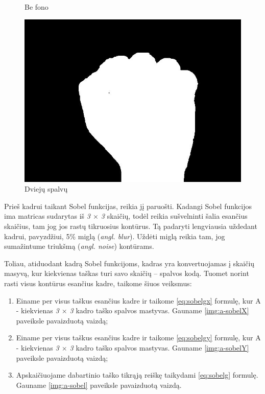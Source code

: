\documentclass{VUMIFInfKursinis}
\begin{document}
\begin{figure}[H]
\begin{minipage}{.3\textwidth}
		\caption{Be fono}
		\label{img:a-black-sign}
	\end{minipage}\hspace{\fill}%
	\begin{minipage}{.3\textwidth}
		\centering
		\includegraphics[width=.8\linewidth]{img/A-white}
		\caption{Dviejų spalvų}
		\label{img:a-white-sign}
	\end{minipage}
\end{figure}

Prieš kadrui taikant Sobel funkcijas, reikia jį paruošti. Kadangi Sobel funkcijos ima matricas sudarytas iš \textit{3 $\times$ 3} skaičių, todėl reikia sušvelninti šalia esančius skaičius, tam jog jos rastų tikruosius kontūrus. Tą padaryti lengviausia uždedant kadrui, pavyzdžiui, 5\% miglą (\textit{angl. blur}). Uždėti miglą reikia tam, jog sumažintume triukšmą (\textit{angl. noise}) kontūrams. 

Toliau, atiduodant kadrą Sobel funkcijoms, kadras yra konvertuojamas į skaičių masyvą, kur kiekvienas taškas turi savo skaičių – spalvos kodą. Tuomet norint rasti visus kontūrus esančius kadre, taikome šiuos veiksmus:

\begin{enumerate}
	\item Einame per visus taškus esančius kadre ir taikome \ref{eq:sobelgx} formulę, kur A - kiekvienas \textit{3 $\times$ 3} kadro taško spalvos mastyvas. Gauname \ref{img:a-sobelX} paveiksle pavaizduotą vaizdą;
	\item Einame per visus taškus esančius kadre ir taikome \ref{eq:sobelgy} formulę, kur A - kiekvienas \textit{3 $\times$ 3} kadro taško spalvos mastyvas. Gauname \ref{img:a-sobelY} paveiksle pavaizduotą vaizdą;
	\item Apskaičiuojame dabartinio taško tikrąją reiškę taikydami \ref{eq:sobelg} formulę. Gauname \ref{img:a-sobel} paveiksle pavaizduotą vaizdą.
\end{enumerate}
\end{document}
